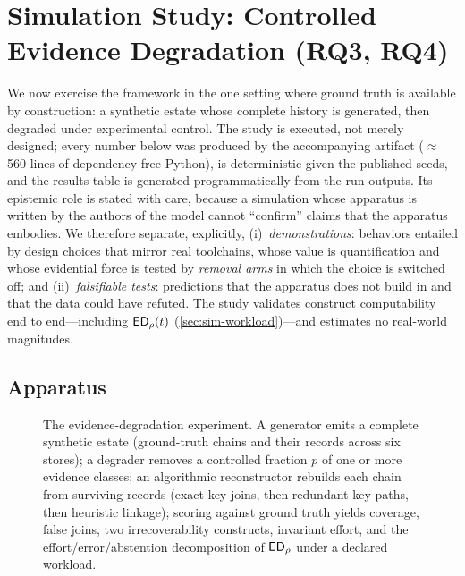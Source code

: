 \section{Simulation Study: Controlled Evidence Degradation (RQ3, RQ4)}
\label{sec:simulation}

We now exercise the framework in the one setting where ground truth is available
by construction: a synthetic estate whose complete history is generated, then
degraded under experimental control. The study is executed, not merely designed;
every number below was produced by the accompanying artifact ($\approx$560 lines of
dependency-free Python), is deterministic given the published seeds, and the
results table is generated programmatically from the run outputs. Its epistemic
role is stated with care, because a simulation whose apparatus is written by the
authors of the model cannot ``confirm'' claims that the apparatus embodies.
We therefore separate, explicitly, (i)~\emph{demonstrations}: behaviors entailed
by design choices that mirror real toolchains, whose value is quantification and
whose evidential force is tested by \emph{removal arms} in which the choice is
switched off; and (ii)~\emph{falsifiable tests}: predictions that the apparatus
does not build in and that the data could have refuted. The study validates
construct computability end to end---including $\mathsf{ED}_\rho(t)$
(\cref{sec:sim-workload})---and estimates no real-world magnitudes.

\subsection{Apparatus}
\label{sec:sim-apparatus}

\begin{figure}[t]
\centering
\resizebox{\columnwidth}{!}{}
\caption{The evidence-degradation experiment. A generator emits a complete
synthetic estate (ground-truth chains and their records across six stores); a
degrader removes a controlled fraction $p$ of one or more evidence classes; an
algorithmic reconstructor rebuilds each chain from surviving records (exact key
joins, then redundant-key paths, then heuristic linkage); scoring against ground
truth yields coverage, false joins, two irrecoverability constructs, invariant
effort, and the effort/error/abstention decomposition of $\mathsf{ED}_\rho$ under a declared
workload.}
\label{fig:experiment}
\end{figure}

